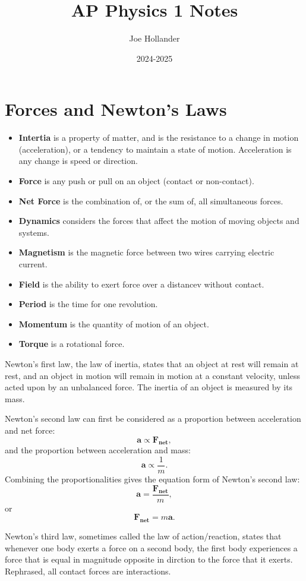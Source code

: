 \documentclass{article}
\title{AP Physics 1 Notes}
\author{Joe Hollander}
\date{2024-2025}
\begin{document}
\maketitle 

\section*{Forces and Newton's Laws}
\begin{itemize} 
    \item \textbf{Intertia} is a property of matter, 
and is the resistance to a change in motion (acceleration),
or a tendency to maintain a state of motion. 
Acceleration is any change is speed or direction.

    \item \textbf{Force} is any push or pull on an object (contact or non-contact).
    \item \textbf{Net Force} is the combination of, or the sum of, all simultaneous forces.
    \item \textbf{Dynamics} considers the forces that affect the motion of moving objects and systems. 
    \item \textbf{Magnetism} is the magnetic force between two wires carrying electric current. 
    \item \textbf{Field} is the ability to exert force over a distancev without contact.
    \item \textbf{Period} is the time for one revolution.  
    \item \textbf{Momentum} is the quantity of motion of an object.
    \item \textbf{Torque} is a rotational force. 
\end{itemize}

Newton's first law, the law of inertia, states that an object at rest will remain at rest, 
and an object in motion will remain in motion at a constant velocity, unless acted upon by an unbalanced force.
The inertia of an object is measured by its mass. 

Newton's second law can first be considered as a proportion between acceleration and net force: 
\[
\mathbf{a \propto F_{net}}, 
\]
and the proportion between acceleration and mass:
\[
\mathbf{a} \propto \frac{1}{m}.
\]
Combining the proportionalities gives the equation form of Newton's second law:
\[
\mathbf{a} = \frac{\mathbf{F_{net}}}{m}, 
\]
or
\[
\mathbf{F_{net}} = m\mathbf{a}.
\]

Newton's third law, sometimes called the law of action/reaction, states that whenever one body exerts a force on a second body, 
the first body experiences a force that is equal in magnitude opposite in dirction to the force that it exerts.
Rephrased, all contact forces are interactions. 
\end{document}
